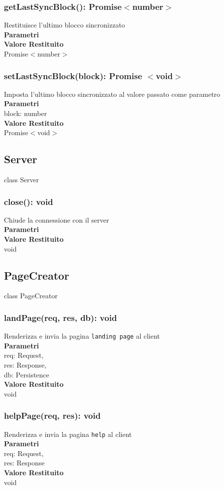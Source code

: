 \documentclass[a4paper, 12pt]{article}
\begin{document}
\subsubsection{getLastSyncBlock(): Promise$<$number$>$}
Restituisce l'ultimo blocco sincronizzato\\
\textbf{Parametri}\\
\textbf{Valore Restituito}\\
Promise$<$number$>$
\subsubsection{setLastSyncBlock(block): Promise $<$void$>$}
Imposta l'ultimo blocco sincronizzato al valore passato come parametro\\
\textbf{Parametri}\\
block: number\\
\textbf{Valore Restituito}\\
Promise$<$void$>$

\subsection{Server}
class Server
\subsubsection{close(): void}
Chiude la connessione con il server\\
\textbf{Parametri}\\
\textbf{Valore Restituito}\\
void

\subsection{PageCreator}
class PageCreator
\subsubsection{landPage(req, res, db): void} 
Renderizza e invia la pagina \texttt{landing page} al client\\
\textbf{Parametri}\\
req: Request,\\
res: Response,\\
db: Persistence\\
\textbf{Valore Restituito}\\
void
\subsubsection{helpPage(req, res): void}
Renderizza e invia la pagina \texttt{help} al client\\
\textbf{Parametri}\\
req: Request,\\
res: Response\\
\textbf{Valore Restituito}\\
void
\end{document}
